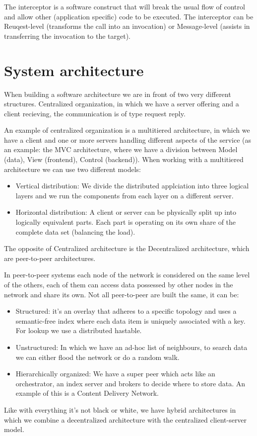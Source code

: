The interceptor is a software construct that will break the usual flow of control and allow other (application specific) code to be executed. The interceptor can be Reuqest-level (transforms the call into an invocation) or Message-level (assists in transferring the invocation to the target).

\section{System architecture}
When building a software architecture we are in front of two very different structures. Centralized organization, in which we have a server offering and a client recieving, the communication is of type request reply.

An example of centralized organization is a multitiered architecture, in which we have a client and one or more servers handling different aspects of the service (as an example: the MVC architecture, where we have a division between Model (data), View (frontend), Control (backend)). When working with a multitiered architecture we can use two different models:
\begin{itemize}
    \item Vertical distribution: We divide the distributed applciation into three logical layers and we run the components from each layer on a different server.
    \item Horizontal distribution: A client or server can be physically split up into logically equivalent parts. Each part is operating on its own share of the complete data set (balancing the load).
\end{itemize}
The opposite of Centralized architecture is the Decentralized architecture, which are peer-to-peer architectures.

In peer-to-peer systems each node of the network is considered on the same level of the others, each of them can access data possessed by other nodes in the network and share its own. Not all peer-to-peer are built the same, it can be:
\begin{itemize}
    \item Structured: it's an overlay that adheres to a specific topology and uses a semantic-free index where each data item is uniquely associated with a key. For lookup we use a distributed hastable.
    \item Unstructured: In which we have an ad-hoc list of neighbours, to search data we can either flood the network or do a random walk.
    \item Hierarchically organized: We have a super peer which acts like an orchestrator, an index server and brokers to decide where to store data. An example of this is a Content Delivery Network.
\end{itemize}
Like with everything it's not black or white, we have hybrid architectures in which we combine a decentralized architecture with the centralized client-server model.

